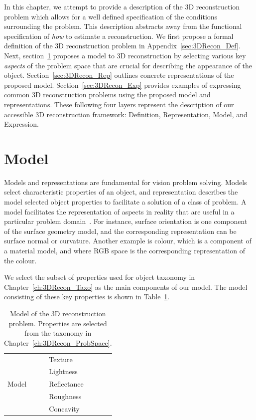 In this chapter, we attempt to provide a description of the 3D reconstruction problem which allows for a well defined specification of the conditions surrounding the problem. This description abstracts away from the functional specification of \textit{how} to estimate a reconstruction. We first propose a formal definition of the 3D reconstruction problem in Appendix~\ref{sec:3DRecon_Def}. Next, section~\ref{sec:3DRecon_Model} proposes a model to 3D reconstruction by selecting various key \textit{aspects} of the problem space that are crucial for describing the appearance of the object. Section~\ref{sec:3DRecon_Rep} outlines concrete representations of the proposed model. Section~\ref{sec:3DRecon_Exp} provides examples of expressing common 3D reconstruction problems using the proposed model and representations. These following four layers represent the description of our accessible 3D reconstruction framework: Definition, Representation, Model, and Expression.


\section{Model}
\label{sec:3DRecon_Model}
Models and representations are fundamental for vision problem solving. Models select characteristic properties of an object, and representation describes the model selected object properties to facilitate a solution of a class of problem. A model facilitates the representation of aspects in reality that are useful in a particular problem domain~\cite{bolles19863dpo}. For instance, surface orientation is one component of the surface geometry model, and the corresponding representation can be surface normal or curvature. Another example is colour, which is a component of a material model, and where RGB space is the corresponding representation of the colour.

We select the subset of properties used for object taxonomy in Chapter~\ref{ch:3DRecon_Taxo} as the main components of our model. The model consisting of these key properties is shown in Table~\ref{tab:3DRecon_model}.
\begin{table}[!htbp]
  \centering
  \begin{tabular}{l|l}
  \toprule
  \multirow{5}{*}{Model} & Texture\\
  & Lightness\\
  & Reflectance\\
  & Roughness\\
  & Concavity\\
  \bottomrule
  \end{tabular}
  \caption{Model of the 3D reconstruction problem. Properties are selected from the taxonomy in Chapter~\ref{ch:3DRecon_ProbSpace}.}
  \label{tab:3DRecon_model}
\end{table}

